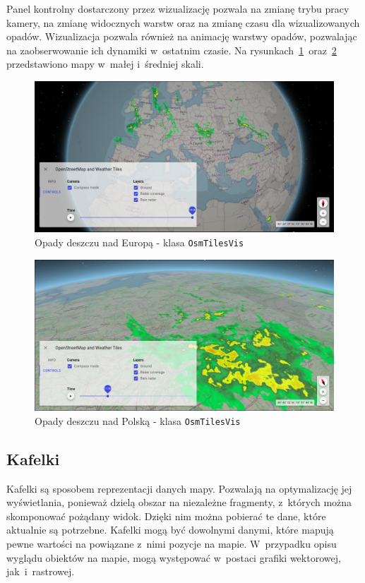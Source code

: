Panel kontrolny dostarczony przez wizualizację pozwala na zmianę trybu pracy kamery, na zmianę widocznych warstw oraz na zmianę czasu dla wizualizowanych opadów. Wizualizacja pozwala również na animację warstwy opadów, pozwalając na zaobserwowanie ich dynamiki w~ostatnim czasie. Na rysunkach~\ref{fig:c4_osmTilesVis}~oraz~\ref{fig:c4_osmTilesVis_1} przedstawiono mapy w~małej i~średniej skali.
\begin{figure}[h]
  \centering
  \includegraphics[width=\linewidth]{img/c4_osmTilesVis.png}
  \caption{Opady deszczu nad Europą - klasa \texttt{OsmTilesVis}}
  \label{fig:c4_osmTilesVis} 
\end{figure}

\begin{figure}[h]
  \centering
  \includegraphics[width=\linewidth]{img/c4_osmTilesVis_1.png}
  \caption{Opady deszczu nad Polską - klasa \texttt{OsmTilesVis}}
  \label{fig:c4_osmTilesVis_1} 
\end{figure}

\subsection{Kafelki}
Kafelki są sposobem reprezentacji danych mapy. Pozwalają na optymalizację jej wyświetlania, ponieważ dzielą obszar na niezależne fragmenty, z~których można skomponować pożądany widok. Dzięki nim można pobierać te dane, które aktualnie są potrzebne. Kafelki mogą być dowolnymi danymi, które mapują pewne wartości na powiązane z~nimi pozycje na mapie. W~przypadku opisu wyglądu obiektów na mapie, mogą występować w~postaci grafiki wektorowej, jak~i~rastrowej.

